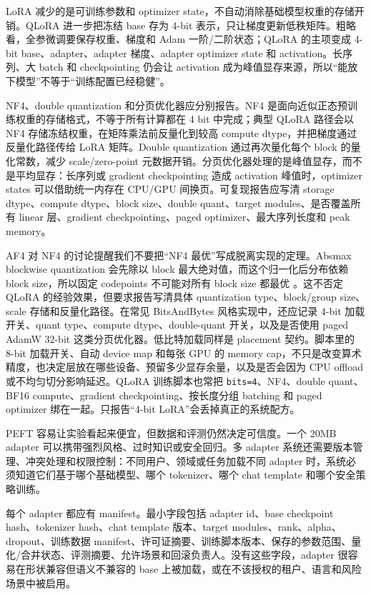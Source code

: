 \documentclass[UTF8,zihao=-4,openany]{ctexbook}
\begin{document}
LoRA 减少的是可训练参数和 optimizer state，不自动消除基础模型权重的存储开销。QLoRA 进一步把冻结 base 存为 4-bit 表示，只让梯度更新低秩矩阵。粗略看，全参微调要保存权重、梯度和 Adam 一阶/二阶状态；QLoRA 的主项变成 4-bit base、adapter、adapter 梯度、adapter optimizer state 和 activation。长序列、大 batch 和 checkpointing 仍会让 activation 成为峰值显存来源，所以“能放下模型”不等于“训练配置已经稳健”。

NF4、double quantization 和分页优化器应分别报告。NF4 是面向近似正态预训练权重的存储格式，不等于所有计算都在 4 bit 中完成；典型 QLoRA 路径会以 NF4 存储冻结权重，在矩阵乘法前反量化到较高 compute dtype，并把梯度通过反量化路径传给 LoRA 矩阵。Double quantization 通过再次量化每个 block 的量化常数，减少 scale/zero-point 元数据开销。分页优化器处理的是峰值显存，而不是平均显存：长序列或 gradient checkpointing 造成 activation 峰值时，optimizer states 可以借助统一内存在 CPU/GPU 间换页。可复现报告应写清 storage dtype、compute dtype、block size、double quant、target modules、是否覆盖所有 linear 层、gradient checkpointing、paged optimizer、最大序列长度和 peak memory。

AF4 对 NF4 的讨论提醒我们不要把“NF4 最优”写成脱离实现的定理。Absmax blockwise quantization 会先除以 block 最大绝对值，而这个归一化后分布依赖 block size，所以固定 codepoints 不可能对所有 block size 都最优 \cite{yoshida2023nf4}。这不否定 QLoRA 的经验效果，但要求报告写清具体 quantization type、block/group size、scale 存储和反量化路径。在常见 BitsAndBytes 风格实现中，还应记录 4-bit 加载开关、quant type、compute dtype、double-quant 开关，以及是否使用 paged AdamW 32-bit 这类分页优化器。低比特加载同样是 placement 契约。脚本里的 8-bit 加载开关、自动 device map 和每张 GPU 的 memory cap，不只是改变算术精度，也决定层放在哪些设备、预留多少显存余量，以及是否会因为 CPU offload 或不均匀切分影响延迟。QLoRA 训练脚本也常把 \texttt{bits=4}、NF4、double quant、BF16 compute、gradient checkpointing、按长度分组 batching 和 paged optimizer 绑在一起。只报告“4-bit LoRA”会丢掉真正的系统配方。

PEFT 容易让实验看起来便宜，但数据和评测仍然决定可信度。一个 20MB adapter 可以携带强烈风格、过时知识或安全回归。多 adapter 系统还需要版本管理、冲突处理和权限控制：不同用户、领域或任务加载不同 adapter 时，系统必须知道它们基于哪个基础模型、哪个 tokenizer、哪个 chat template 和哪个安全策略训练。

每个 adapter 都应有 manifest。最小字段包括 adapter id、base checkpoint hash、tokenizer hash、chat template 版本、target modules、rank、alpha、dropout、训练数据 manifest、许可证摘要、训练脚本版本、保存的参数范围、量化/合并状态、评测摘要、允许场景和回滚负责人。没有这些字段，adapter 很容易在形状兼容但语义不兼容的 base 上被加载，或在不该授权的租户、语言和风险场景中被启用。
\end{document}
